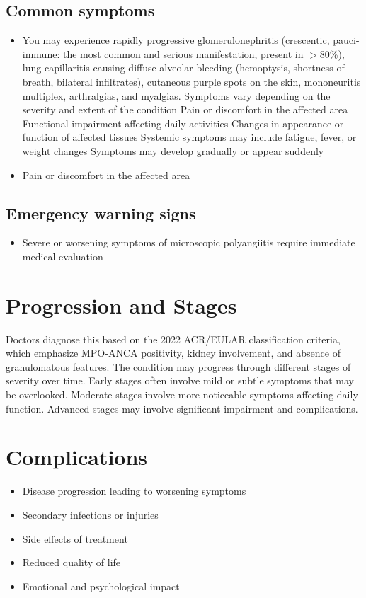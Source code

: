 \subsection{Common symptoms}
\begin{itemize}[noitemsep]
  \item You may experience rapidly progressive glomerulonephritis (crescentic, pauci-immune: the most common and serious manifestation, present in $>$80\%), lung capillaritis causing diffuse alveolar bleeding (hemoptysis, shortness of breath, bilateral infiltrates), cutaneous purple spots on the skin, mononeuritis multiplex, arthralgias, and myalgias. Symptoms vary depending on the severity and extent of the condition Pain or discomfort in the affected area Functional impairment affecting daily activities Changes in appearance or function of affected tissues Systemic symptoms may include fatigue, fever, or weight changes Symptoms may develop gradually or appear suddenly
  \item Pain or discomfort in the affected area
  \end{itemize}

\subsection{Emergency warning signs}
\begin{itemize}[noitemsep]
  \item Severe or worsening symptoms of microscopic polyangiitis require immediate medical evaluation
\end{itemize}
\section{Progression and Stages}
Doctors diagnose this based on the 2022 ACR/EULAR classification criteria, which emphasize MPO-ANCA positivity, kidney involvement, and absence of granulomatous features. The condition may progress through different stages of severity over time. Early stages often involve mild or subtle symptoms that may be overlooked. Moderate stages involve more noticeable symptoms affecting daily function. Advanced stages may involve significant impairment and complications.
\section{Complications}
\begin{itemize}[noitemsep]
  \item Disease progression leading to worsening symptoms
  \item Secondary infections or injuries
  \item Side effects of treatment
  \item Reduced quality of life
  \item Emotional and psychological impact
\end{itemize}
